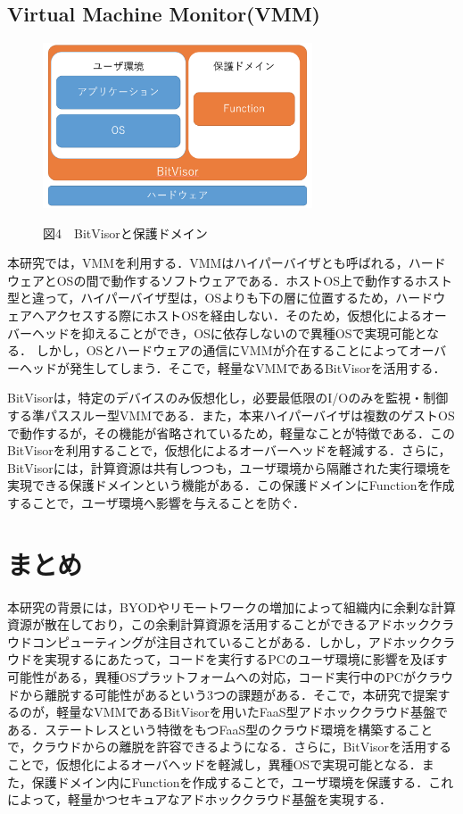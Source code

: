 \documentclass[11pt]{ujarticle} %
\begin{document}
\subsection{Virtual Machine Monitor(VMM)}
\begin{figure}[h]
  \includegraphics[width=8cm]{img/BitVisor.png}
\begin{center}図4　BitVisorと保護ドメイン\end{center}
\end{figure}
本研究では，VMMを利用する．VMMはハイパーバイザとも呼ばれる，ハードウェアとOSの間で動作するソフトウェアである．ホストOS上で動作するホスト型と違って，ハイパーバイザ型は，OSよりも下の層に位置するため，ハードウェアへアクセスする際にホストOSを経由しない．そのため，仮想化によるオーバーヘッドを抑えることができ，OSに依存しないので異種OSで実現可能となる． しかし，OSとハードウェアの通信にVMMが介在することによってオーバーヘッドが発生してしまう．そこで，軽量なVMMであるBitVisorを活用する\cite{BitVisor}．

BitVisorは，特定のデバイスのみ仮想化し，必要最低限のI/Oのみを監視・制御する準パススルー型VMMである．また，本来ハイパーバイザは複数のゲストOSで動作するが，その機能が省略されているため，軽量なことが特徴である．このBitVisorを利用することで，仮想化によるオーバーヘッドを軽減する．さらに，BitVisorには，計算資源は共有しつつも，ユーザ環境から隔離された実行環境を実現できる保護ドメインという機能がある．この保護ドメインにFunctionを作成することで，ユーザ環境へ影響を与えることを防ぐ．


\section{まとめ}
本研究の背景には，BYODやリモートワークの増加によって組織内に余剰な計算資源が散在しており，この余剰計算資源を活用することができるアドホッククラウドコンピューティングが注目されていることがある．しかし，アドホッククラウドを実現するにあたって，コードを実行するPCのユーザ環境に影響を及ぼす可能性がある，異種OSプラットフォームへの対応，コード実行中のPCがクラウドから離脱する可能性があるという3つの課題がある．そこで，本研究で提案するのが，軽量なVMMであるBitVisorを用いたFaaS型アドホッククラウド基盤である．ステートレスという特徴をもつFaaS型のクラウド環境を構築することで，クラウドからの離脱を許容できるようになる．さらに，BitVisorを活用することで，仮想化によるオーバヘッドを軽減し，異種OSで実現可能となる．また，保護ドメイン内にFunctionを作成することで，ユーザ環境を保護する．これによって，軽量かつセキュアなアドホッククラウド基盤を実現する．
\end{document}
